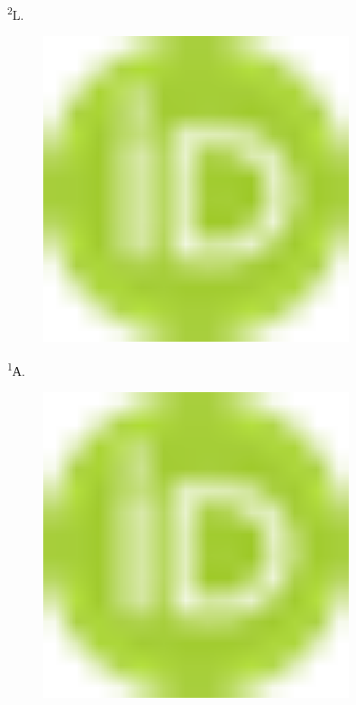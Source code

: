 \textsuperscript{2}L.
\begin{figure}[H]
	\centering
	\includegraphics[width=0.8\textwidth]{media/ict3/image1}
	\caption*{}
\end{figure}

\textsuperscript{1}А.
\begin{figure}[H]
	\centering
	\includegraphics[width=0.8\textwidth]{media/ict3/image1}
	\caption*{}
\end{figure}

